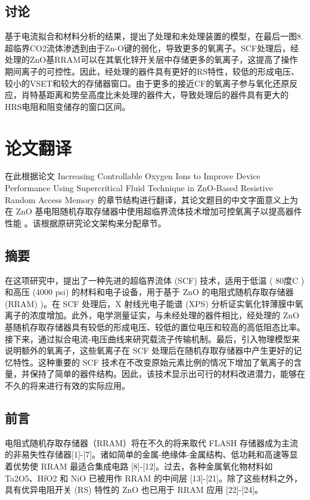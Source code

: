 \subsection{讨论}

基于电流拟合和材料分析的结果，提出了处理和未处理装置的模型，在最后一图8.超临界CO2流体渗透到由于Zn-O键的弱化，导致更多的氧离子。SCF处理后，经处理的ZnO基RRAM可以在其氧化锌开关层中存储更多的氧离子，这提高了操作期间离子的可控性。因此，经处理的器件具有更好的RS特性，较低的形成电压、较小的VSET和较大的存储器窗口。由于更多的接近CF的氧离子参与氧化还原反应，肖特基距离和势垒高度比未处理的器件大，导致处理后的器件具有更大的HRS电阻和阻变储存的窗口区间。

\section{论文翻译}

在此根据论文 Increasing Controllable Oxygen Ions to Improve Device Performance Using Supercritical Fluid Technique in ZnO-Based Resistive Random Access Memory  的章节结构进行翻译，其论文题目的中文字面意义上为在 ZnO 基电阻随机存取存储器中使用超临界流体技术增加可控氧离子以提高器件性能 。该根据原研究论文架构来分配章节。

\subsection{摘要}

在这项研究中，提出了一种先进的超临界流体 (SCF) 技术，适用于低温 ( 80度C ) 和高压 (4000 psi) 的材料和电子设备，用于基于 ZnO 的电阻式随机存取存储器 (RRAM) )。在 SCF 处理后，X 射线光电子能谱 (XPS) 分析证实氧化锌薄膜中氧离子的浓度增加。此外，电学测量证实，与未经处理的器件相比，经处理的 ZnO 基随机存取存储器具有较低的形成电压、较低的置位电压和较高的高低阻态比率。接下来，通过拟合电流-电压曲线来研究载流子传输机制。最后，引入物理模型来说明额外的氧离子，这些氧离子在 SCF 处理后在随机存取存储器中产生更好的记忆特性。这种重要的 SCF 技术在不改变原始元素比例的情况下增加了氧离子的含量，并保持了简单的器件结构。因此，该技术显示出可行的材料改进潜力，能够在不久的将来进行有效的实际应用。

\subsection{前言}

电阻式随机存取存储器（RRAM）将在不久的将来取代 FLASH 存储器成为主流的非易失性存储器[1]-[7]。诸如简单的金属-绝缘体-金属结构、低功耗和高速等显着优势使 RRAM 最适合集成电路 [8]-[12]。过去，各种金属氧化物材料如 Ta2O5、HfO2 和 NiO 已被用作 RRAM 的中间层 [13]-[21]。除了这些材料之外，具有优异电阻开关 (RS) 特性的 ZnO 也已用于 RRAM 应用 [22]-[24]。

